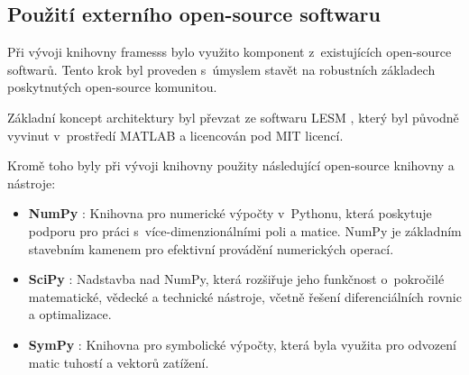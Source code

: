 \subsection{Použití externího open-source softwaru}

Při vývoji knihovny framesss bylo využito komponent z~existujících open-source softwarů. Tento krok byl proveden s~úmyslem stavět na robustních základech poskytnutých open-source komunitou.

Základní koncept architektury byl převzat ze softwaru LESM \cite{lesm}, který byl původně vyvinut v~prostředí MATLAB a licencován pod MIT licencí.

Kromě toho byly při vývoji knihovny použity následující open-source knihovny a nástroje:
\begin{itemize}
    \item \textbf{NumPy} \cite{numpy}: Knihovna pro numerické výpočty v~Pythonu, která poskytuje podporu pro práci s~více-dimenzionálními poli a matice. NumPy je základním stavebním kamenem pro efektivní provádění numerických operací.
    \item \textbf{SciPy} \cite{scipy}: Nadstavba nad NumPy, která rozšiřuje jeho funkčnost o~pokročilé matematické, vědecké a technické nástroje, včetně řešení diferenciálních rovnic a optimalizace.
    \item \textbf{SymPy} \cite{sympy}: Knihovna pro symbolické výpočty, která byla využita pro odvození matic tuhostí a vektorů zatížení.
\end{itemize}


